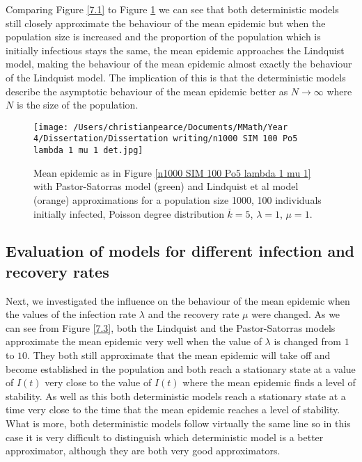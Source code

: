 \documentclass{uonmathsreport}
\begin{document}
Comparing Figure \ref{7.1} to Figure \ref{7.2} we can see that both deterministic models still closely approximate the behaviour of the mean epidemic but when the population size is increased and the proportion of the population which is initially infectious stays the same, the mean epidemic approaches the Lindquist model, making the behaviour of the mean epidemic almost exactly the behaviour of the Lindquist model. The implication of this is that the deterministic models describe the asymptotic behaviour of the mean epidemic better as $N\rightarrow\infty$ where $N$ is the size of the population.

\begin{figure}
\begin{center}
\texttt{[image: /Users/christianpearce/Documents/MMath/Year 4/Dissertation/Dissertation writing/n1000 SIM 100 Po5 lambda 1 mu 1 det.jpg]}
\end{center}
\caption{Mean epidemic as in Figure \ref{n1000 SIM 100 Po5 lambda 1 mu 1} with Pastor-Satorras model (green) and Lindquist et al model (orange) approximations for a population size 1000, 100 individuals initially infected, Poisson degree distribution $\overline{k}=5$, $\lambda=1$, $\mu=1$.}
\label{7.2}
\end{figure}

\subsection{Evaluation of models for different infection and recovery rates} \label{subsec:7.2}

Next, we investigated the influence on the behaviour of the mean epidemic when the values of the infection rate $\lambda$ and the recovery rate $\mu$ were changed. As we can see from Figure \ref{7.3}, both the Lindquist and the Pastor-Satorras models approximate the mean epidemic very well when the value of $\lambda$ is changed from $1$ to $10$. They both still approximate that the mean epidemic will take off and become established in the population and both reach a stationary state at a value of $I(t)$ very close to the value of $I(t)$ where the mean epidemic finds a level of stability. As well as this both deterministic models reach a stationary state at a time very close to the time that the mean epidemic reaches a level of stability. What is more, both deterministic models follow virtually the same line so in this case it is very difficult to distinguish which deterministic model is a better approximator, although they are both very good approximators.
\end{document}
